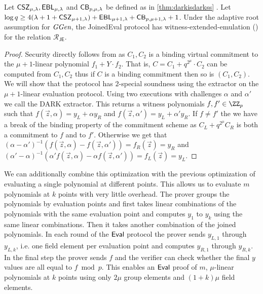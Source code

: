 \newcommand{\theoremjoined}{
	Let $\CSZ,\EBL$ and $\CorrectnessBound$ be defined as in \cref{thm:darkisdarkss} . Let  $\log q \geq 4(\lambda + 1 + \CSZ[\mu+1]) + \EBL[\mu+1] + \CorrectnessBound[\mu+1] + 1$.
Under the adaptive root assumption for $\ggen$, the \textsf{JoinedEval} protocol has witness-extended-emulation (\Cref{def:wee}) for the relation $\mathcal{R_\textsf{JE}}$. }
\begin{theorem}
\label{thm:joined}
\theoremjoined
\end{theorem}
\begin{proof}
	Security directly follows from  as $C_1,C_2$ is a binding virtual commitment to the $\mu+1$-linear polynomial $f_1+ Y \cdot f_2$. That is, $C=C_1+q^{2^\mu} \cdot C_2$ can be computed from $C_1,C_2$ thus if $C$ is a binding commitment then so is $(C_1,C_2)$. We will show that the protocol has $2$-special soundness using the extractor on the $\mu+1$-linear evaluation protocol. Using two executions with challenges $\alpha$ and $\alpha'$ we call the DARK extractor. This returns a witness polynomials $f,f' \in \ZZ_p$ such that $f(\vec{z},\alpha)=y_L+\alpha y_R$ and $f(\vec{z},\alpha')=y_L+\alpha'y_R$. If $f\neq f'$ the we have a break of the binding property of the commitment scheme as $C_L+q^{2^\mu} C_R$ is both a commitment to $f$ and to $f'$. Otherwise we get that $(\alpha-\alpha')^{-1}( f(\vec{z},\alpha)-f(\vec{z},\alpha'))=f_R(\vec{z})=y_R$ and $(\alpha'-\alpha)^{-1}(\alpha' f(\vec{z},\alpha)-\alpha f(\vec{z},\alpha'))=f_L(\vec{z})=y_L$. 
\end{proof}

We can additionally combine this optimization with the previous optimization of evaluating a single polynomial at different points. This allows us to evaluate $m$ polynomials at $k$ points with very little overhead. 
The prover groups the polynomials by evaluation points and first takes linear combinations of the polynomials with the same evaluation point and computes $y_1$ to $y_k$ using the same linear combinations. Then it takes another combination of the joined polynomials. In each round of the $\textsf{{Eval}}$ protocol the prover sends $y_{L,1}$ through $y_{L,k}$, i.e. one field element per evaluation point and computes $y_{R,1}$ through $y_{R,k}$. In the final step the prover sends $f$ and the verifier can check whether the final $y$ values are all equal to $f\bmod p$.
 This enables an $\textsf{{Eval}}$ proof of $m$, $\mu$-linear polynomials at $k$ points using only $2\mu$ group elements and $(1+k)\mu$ field elements.
 
